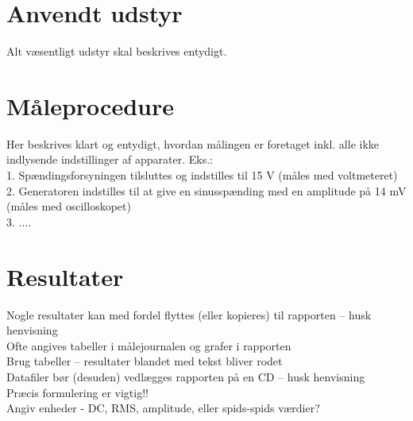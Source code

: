 \section{Anvendt udstyr}
\label{maalejournal_anvendtudstyr}
Alt væsentligt udstyr skal beskrives entydigt.\\

\section{Måleprocedure}
\label{maalejournal_maaleprocedure}
Her beskrives klart og entydigt, hvordan målingen er foretaget inkl. alle ikke indlysende indstillinger af apparater. Eks.: \\
1. Spændingsforsyningen tilsluttes og indstilles til 15 V (måles med voltmeteret) \\
2. Generatoren indstilles til at give en sinusspænding med en amplitude på 14 mV (måles med oscilloskopet) \\
3. ....\\

\section{Resultater}
\label{maalejournal_resultater}
Nogle resultater kan med fordel flyttes (eller kopieres) til rapporten – husk henvisning \\
Ofte angives tabeller i målejournalen og grafer i rapporten \\
Brug tabeller – resultater blandet med tekst bliver rodet\\
Datafiler bør (desuden) vedlægges rapporten på en CD – husk henvisning\\
Præcis formulering er vigtig!!\\
Angiv enheder - DC, RMS, amplitude, eller spids-spids værdier?\\

